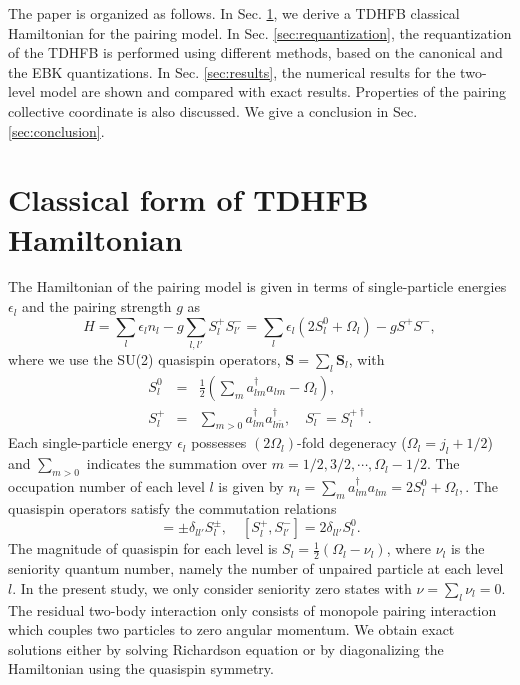 \documentclass[%
superscriptaddress,
preprint,
showpacs,
nofootinbib,
amsmath,amssymb,
prc,
floatfix ]%
{revtex4-1}
\begin{document}
The paper is organized as follows. 
In Sec. \ref{sec:TDHFB},
we derive a TDHFB classical Hamiltonian for the pairing model.
In Sec. \ref{sec:requantization}, 
the requantization of the TDHFB is performed using different methods,
based on the canonical and the EBK quantizations.
In Sec. \ref{sec:results}, 
the numerical results for the two-level model are shown and compared with
exact results.
Properties of the pairing collective coordinate is also discussed.
We give a conclusion in Sec. \ref{sec:conclusion}.


\section{Classical form of TDHFB Hamiltonian}
\label{sec:TDHFB}

The Hamiltonian of the pairing model is given in terms of
single-particle energies $\epsilon_l$ and the pairing strength $g$ as
\begin{equation}
	H = \sum_l \epsilon_l n_l - g \sum_{l,l'} S_l^+ S_{l'}^-
    = \sum_l\epsilon_l(2S_l^0+\Omega_l) - g S^+ S^{-} ,
\end{equation}
where we use the SU(2) quasispin operators,
$\boldsymbol{S}=\sum_l \boldsymbol{S}_l$, with
\begin{eqnarray}
        S_l^0 &=& \frac{1}{2}(\sum_ma_{lm}^{\dag}a_{lm}-\Omega_l) ,\\
        S_l^{+} &=& \sum_{m>0}a_{lm}^{\dag}a_{l\overline{m}}^{\dag} ,
\quad   S_l^{-} = S_l^{+\dag} .
\end{eqnarray}
Each single-particle energy $\epsilon_l$ possesses $(2\Omega_l)$-fold
degeneracy ($\Omega_l=j_l+1/2$)
and $\sum_{m>0}$ indicates the summation over $m=1/2,3/2,\cdots,\Omega_l-1/2$.
The occupation number of each level $l$ is given by
$
	n_l = \sum_m a^{\dag}_{lm}a_{lm} = 2S_l^0+\Omega_l ,
$.
The quasispin operators satisfy the commutation relations
\begin{equation}
  [S_l^0,S_{l'}^{\pm}] = \pm\delta_{ll'}S_{l}^{\pm},
	\quad [S_{l}^{+},S_{l'}^{-}] = 2\delta_{ll'}S_{l}^{0} .
\end{equation}
The magnitude of quasispin for each level is
$S_l=\frac{1}{2}(\Omega_l-\nu_l)$, where $\nu_l$ is the seniority
quantum number, namely the number of unpaired particle at each level $l$.
In the present study, we only consider seniority zero states with
$\nu=\sum_l \nu_l=0$.
The residual two-body interaction only consists of monopole pairing
interaction which couples two particles to zero angular momentum.
We obtain exact solutions either by solving Richardson equation
\cite{Richardson,Richardson2,Richardson3} or
by diagonalizing the Hamiltonian using the quasispin symmetry.
\end{document}
